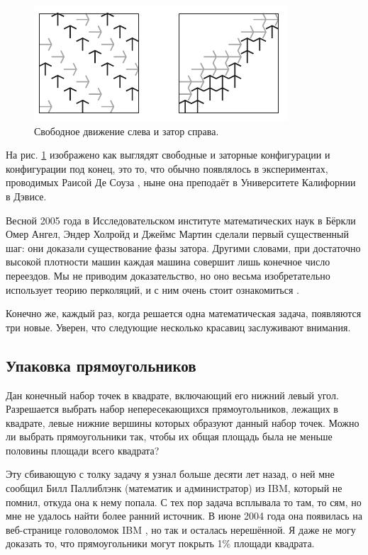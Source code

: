 \begin{figure}[htb!]
\centering
\includegraphics[scale=1]{pics/gridlock}
\caption{Свободное движение слева и затор справа.}
\label{pic:gridlock}
\end{figure}

На рис. \ref{pic:gridlock} изображено как выглядят свободные и заторные конфигурации и конфигурации под конец, это то, что обычно появлялось в экспериментах, проводимых Раисой Де Соуза \cite{15}, ныне она преподаёт в Университете Калифорнии в Дэвисе.

Весной 2005 года в Исследовательском институте математических наук в Бёркли Омер Ангел, Эндер Холройд и Джеймс Мартин сделали первый существенный шаг: они доказали существование фазы затора.
Другими словами, при достаточно высокой плотности машин каждая машина совершит лишь конечное число переездов.
Мы не приводим доказательство, но оно весьма изобретательно использует теорию перколяций, и с ним очень стоит ознакомиться \cite{2}.

\medskip

Конечно же, каждый раз, когда решается одна математическая задача, появляются три новые.
Уверен, что следующие несколько красавиц заслуживают внимания.

\subsection*{Упаковка прямоугольников}

Дан конечный набор точек в квадрате, включающий его нижний левый угол.
Разрешается выбрать набор непересекающихся прямоугольников, лежащих в квадрате, левые нижние вершины которых образуют данный набор точек.
Можно ли выбрать прямоугольники так, чтобы их общая площадь была не меньше половины площади всего квадрата?

\medskip

Эту сбивающую с толку задачу я узнал больше десяти лет назад,
о ней мне сообщил Билл Паллиблэнк (математик и администратор) из IBM, который не помнил, откуда она к нему попала.
С тех пор задача всплывала то там, то сям, но мне не удалось найти более ранний источник.
В июне 2004 года она появилась на веб-странице головоломок IBM \cite{ponder-this}, но так и осталась нерешённой.
Я даже не могу доказать то, что прямоугольники могут покрыть 1\% площади квадрата.

